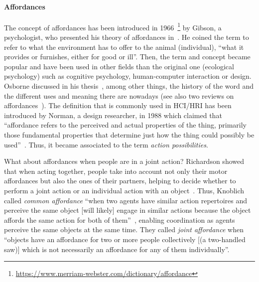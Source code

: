 \documentclass[a4paper,11pt,twoside]{StyleThese}
\begin{document}
\paragraph{Affordances}
The concept of affordances has been introduced in 1966~\footnote{\url{https://www.merriam-webster.com/dictionary/affordance}} by Gibson, a psychologist, who presented his theory of affordances in~\cite{gibson_1979_theory}. He coined the term to refer to what the environment has to offer to the animal (individual), ``what it provides or furnishes, either for good or ill''. Then, the term and concept became popular and have been used in other fields than the original one (ecological psychology) such as cognitive psychology, human-computer interaction or design. Osborne discussed in his thesis~\cite{osborne_2014_ecological}, among other things, the history of the word and the different uses and meaning there are nowadays (see also two reviews on affordances~\cite{jamone_2016_affordances, bach_2014_affordance}). The definition that is commonly used in HCI/HRI has been introduced by Norman, a design researcher, in 1988 which claimed that ``affordance refers to the perceived and actual properties of the thing, primarily those fundamental properties that determine just how the thing could possibly be used''~\cite[p.~9]{norman_1988_psychology}. Thus, it became associated to the term \emph{action possibilities}. 

What about affordances when people are in a joint action? Richardson \etal{} showed that when acting together, people take into account not only their motor affordances but also the ones of their partners, helping to decide whether to perform a joint action or an individual action with an object~\cite{richardson_2007_judging}. Thus, Knoblich \etal{} called \emph{common affordance} ``when two agents have similar action repertoires and perceive the same object [will likely] engage in similar actions because the object affords the same action for both of them''~\cite[p.~63]{knoblich_2011_joint}, enabling coordination as agents perceive the same objects at the same time. They called \emph{joint affordance} when ``objects have an affordance for two or more people collectively [(a two-handled saw)] which is not necessarily an affordance for any of them individually''.
\end{document}
